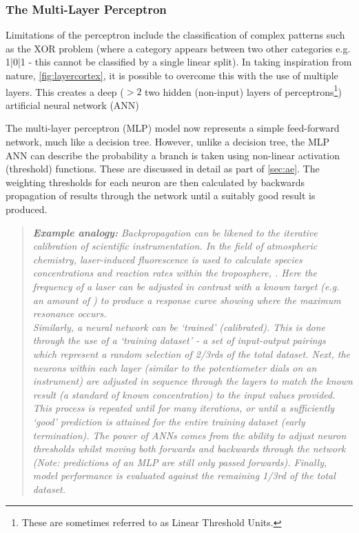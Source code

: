 \subsubsection{The Multi-Layer Perceptron}\label{sec:perceptron}
Limitations of the perceptron include the classification of complex patterns such as the XOR problem (where a category appears between two other categories e.g. {1|0|1} - this cannot be classified by a single linear split). In taking inspiration from nature, \autoref{fig:layercortex}, it is possible to overcome this with the use of multiple layers. This creates a deep ($>2$ two hidden (non-input) layers of perceptrons\footnote{These are sometimes referred to as Linear Threshold Units.}) artificial neural network (ANN) 

The multi-layer perceptron (MLP) model now represents a simple feed-forward network, much like a decision tree. However, unlike a decision tree, the MLP ANN can describe the probability a branch is taken using non-linear activation (threshold) functions. These are discussed in detail as part of \autoref{sec:ae}. The weighting thresholds for each neuron are then calculated by backwards propagation of results through the network until a suitably good result is produced. 

\begin{quote}
\textit{
\textbf{Example analogy:} Backpropagation can be likened to the iterative calibration of scientific instrumentation. In the field of atmospheric chemistry, laser-induced fluorescence is used to calculate species concentrations and reaction rates within the troposphere, \citep{lif1,lif2}. Here the frequency of a laser can be adjusted in contrast with a known target (e.g. an amount of ) to produce a response curve showing where the maximum resonance occurs.\\
Similarly, a neural network can be `trained' (calibrated). 
This is done through the use of a `training dataset' - a set of input-output pairings which represent a random selection of 2/3rds of the total dataset. Next, the neurons within each layer (similar to the potentiometer dials on an instrument) are adjusted in sequence through the layers to match the known result (a standard of known concentration) to the input values provided. This process is repeated until for many iterations, or until a sufficiently `good' prediction is attained for the entire training dataset (early termination). The power of ANNs comes from the ability to adjust neuron thresholds whilst moving both forwards and backwards through the network (Note: predictions of an MLP are still only passed forwards). Finally, model performance is evaluated against the remaining 1/3rd of the total dataset.
}
\end{quote}


